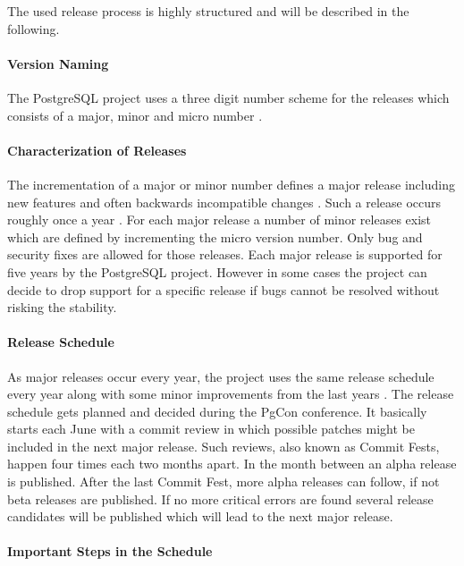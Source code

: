 The used release process is highly structured and will be described in the
following.

\paragraph{Version Naming}

The PostgreSQL project uses a three digit number scheme for the releases which
consists of a major, minor and micro number \cite{PostgreSQLVersioning}.

\paragraph{Characterization of Releases}

The incrementation of a major or minor number defines a major release including
new features and often backwards incompatible changes
\cite{PostgreSQLVersioning}. Such a release occurs roughly once a year
\cite{PostgreSQLDevelopment,PostgreSQLFAQ}. For each major release a number of
minor releases exist which are defined by incrementing the micro version
number. Only bug and security fixes are allowed for those releases. Each major
release is supported for five years by the PostgreSQL project. However in some
cases the project can decide to drop support for a specific release if bugs
cannot be resolved without risking the stability.

\paragraph{Release Schedule}

As major releases occur every year, the project uses the same release schedule
every year along with some minor improvements from the last years
\cite{PostgreSQLDevelopment}. The release schedule gets planned and decided
during the PgCon conference. It basically starts each June with a commit review
in which possible patches might be included in the next major release. Such
reviews, also known as Commit Fests, happen four times each two months apart.
In the month between an alpha release is published. After the last Commit Fest,
more alpha releases can follow, if not beta releases are published. If no more
critical errors are found several release candidates will be published which
will lead to the next major release.

\paragraph{Important Steps in the Schedule}

